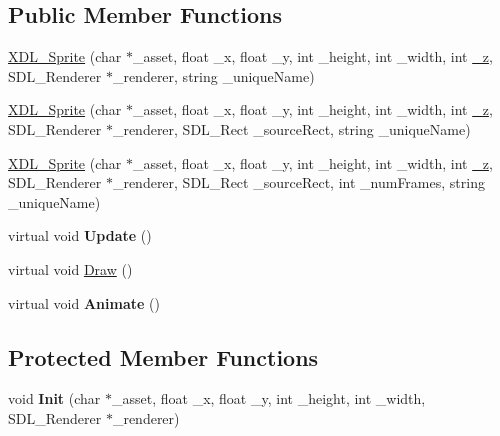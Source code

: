 \subsection*{Public Member Functions}
\begin{DoxyCompactItemize}
\item 
\hyperlink{class_x_d_l___sprite_a17aa0483052cf03519f4885966ee8e1b}{X\-D\-L\-\_\-\-Sprite} (char $\ast$\-\_\-asset, float \-\_\-x, float \-\_\-y, int \-\_\-height, int \-\_\-width, int \hyperlink{class_x_d_l___game_object_a62a08106992c783507c669f71a6dd6a6}{\-\_\-z}, S\-D\-L\-\_\-\-Renderer $\ast$\-\_\-renderer, string \-\_\-unique\-Name)
\item 
\hyperlink{class_x_d_l___sprite_a1be30c1e18f81665dbf8833faaa29925}{X\-D\-L\-\_\-\-Sprite} (char $\ast$\-\_\-asset, float \-\_\-x, float \-\_\-y, int \-\_\-height, int \-\_\-width, int \hyperlink{class_x_d_l___game_object_a62a08106992c783507c669f71a6dd6a6}{\-\_\-z}, S\-D\-L\-\_\-\-Renderer $\ast$\-\_\-renderer, S\-D\-L\-\_\-\-Rect \-\_\-source\-Rect, string \-\_\-unique\-Name)
\item 
\hyperlink{class_x_d_l___sprite_accb0cd8b6f2b18c3f5927082fc057b8d}{X\-D\-L\-\_\-\-Sprite} (char $\ast$\-\_\-asset, float \-\_\-x, float \-\_\-y, int \-\_\-height, int \-\_\-width, int \hyperlink{class_x_d_l___game_object_a62a08106992c783507c669f71a6dd6a6}{\-\_\-z}, S\-D\-L\-\_\-\-Renderer $\ast$\-\_\-renderer, S\-D\-L\-\_\-\-Rect \-\_\-source\-Rect, int \-\_\-num\-Frames, string \-\_\-unique\-Name)
\item 
\hypertarget{class_x_d_l___sprite_a1ecd6d713ce320cd1d49dceea854e0d2}{virtual void {\bfseries Update} ()}\label{class_x_d_l___sprite_a1ecd6d713ce320cd1d49dceea854e0d2}

\item 
virtual void \hyperlink{class_x_d_l___sprite_a5b1c9b886c59f06cfbb2c428b3f58e86}{Draw} ()
\item 
\hypertarget{class_x_d_l___sprite_af594d7e5987b56ea146e640b9ced33b2}{virtual void {\bfseries Animate} ()}\label{class_x_d_l___sprite_af594d7e5987b56ea146e640b9ced33b2}

\end{DoxyCompactItemize}
\subsection*{Protected Member Functions}
\begin{DoxyCompactItemize}
\item 
\hypertarget{class_x_d_l___sprite_a30ef3609e3bb1a36dea1d6bf3d5628f4}{void {\bfseries Init} (char $\ast$\-\_\-asset, float \-\_\-x, float \-\_\-y, int \-\_\-height, int \-\_\-width, S\-D\-L\-\_\-\-Renderer $\ast$\-\_\-renderer)}\label{class_x_d_l___sprite_a30ef3609e3bb1a36dea1d6bf3d5628f4}

\end{DoxyCompactItemize}
